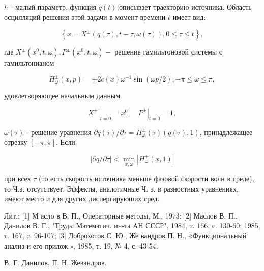 \documentclass[10pt]{article}
\begin{document}
$h$ - малый параметр, функция $q(t)$ описывает траекторию источника. Область осцилляций решения этой задачи в момент времени $t$ имеет вид:



\[

\left\{x=X^{ \pm}(q(\tau), t-\tau, \omega(\tau)), 0 \leqslant \tau \leqslant t\right\},

\]



где $X^{ \pm}\left(x^{0}, t, \omega\right), P^{ \pm}\left(x^{0}, t, \omega\right)-$ решение гамильтоновой системы с гамильтонианом



\[

H_{\omega}^{ \pm}(x, p)= \pm 2 c(x) \omega^{-1} \sin (\omega p / 2),-\pi \leqslant \omega \leqslant \pi,

\]



удовлетворяющее начальным данным



\[

\left.X^{ \pm}\right|_{t=0}=x^{0},\left.\quad P^{ \pm}\right|_{t=0}=1,

\]



$\omega(\tau)$ - решение уравнения $\partial q(\tau) / \partial \tau=H_{\omega}^{ \pm}(\tau)(q(\tau), 1)$, принадлежащее отрезку $[-\pi, \pi]$. Если



\[

|\partial q / \partial \tau|<\min _{x, \omega}\left|H_{\omega}^{ \pm}(x, 1)\right|

\]



при всех $\tau$ (то есть скорость источника меньше фазовой скорости волн в среде), то Ч.э. отсутствует. Эффекты, аналогичные Ч. э. в разностных уравнениях, имеют место и для других диспергируюших сред.



Лит.: [1] М асло в В. П., Операторные методы, М., 1973; [2] Маслов В. П., Данилов В. Г., "Труды Математич. ин-та AН СССР", 1984, т. 166, с. 130-60; 1985, т. 167, c. 96-107; [3] Доброхотов С. Ю., Же вандров П. Н., «Функциональный анализ и его прилож.», 1985, т. 19, № 4, с. 43-54.



В. Г. Данилов, П. Н. Жевандров.
\end{document}
